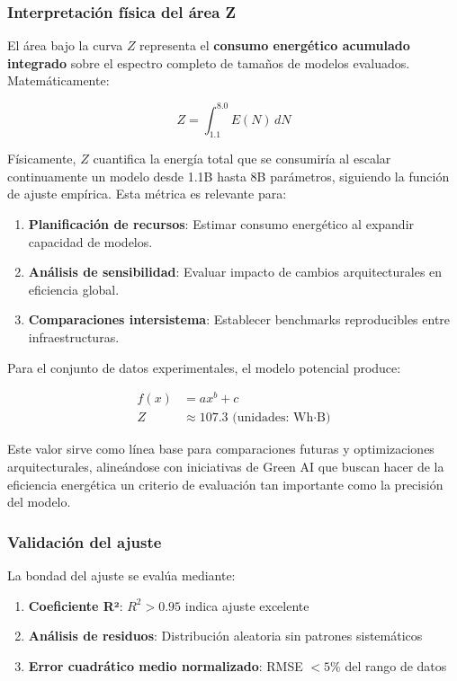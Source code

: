 \subsubsection{Interpretación física del área Z}

El área bajo la curva $Z$ representa el \textbf{consumo energético acumulado integrado} sobre el espectro completo de tamaños de modelos evaluados. Matemáticamente:

\begin{equation}
Z = \int_{1.1}^{8.0} E(N) \, dN
\end{equation}

Físicamente, $Z$ cuantifica la energía total que se consumiría al escalar continuamente un modelo desde 1.1B hasta 8B parámetros, siguiendo la función de ajuste empírica. Esta métrica es relevante para:

\begin{enumerate}
    \item \textbf{Planificación de recursos}: Estimar consumo energético al expandir capacidad de modelos.
    \item \textbf{Análisis de sensibilidad}: Evaluar impacto de cambios arquitecturales en eficiencia global.
    \item \textbf{Comparaciones intersistema}: Establecer benchmarks reproducibles entre infraestructuras.
\end{enumerate}

Para el conjunto de datos experimentales, el modelo potencial produce:

\begin{align}
f(x) &= a x^b + c \\
Z &\approx 107.3 \text{ (unidades: Wh·B)}
\end{align}

Este valor sirve como línea base para comparaciones futuras y optimizaciones arquitecturales, alineándose con iniciativas de Green AI \cite{greensoftware2025position, schwartz2019green} que buscan hacer de la eficiencia energética un criterio de evaluación tan importante como la precisión del modelo.

\subsubsection{Validación del ajuste}

La bondad del ajuste se evalúa mediante:

\begin{enumerate}
    \item \textbf{Coeficiente R²}: $R^2 > 0.95$ indica ajuste excelente
    \item \textbf{Análisis de residuos}: Distribución aleatoria sin patrones sistemáticos
    \item \textbf{Error cuadrático medio normalizado}: RMSE $< 5\%$ del rango de datos
\end{enumerate}

